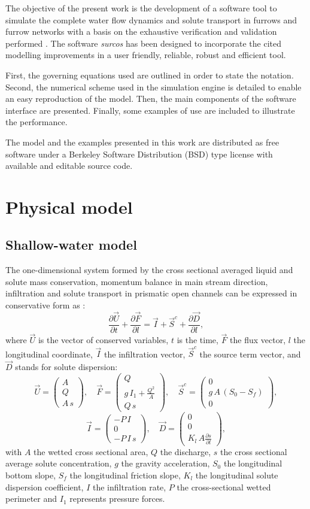 \documentclass[review,authoryear]{elsarticle}
\newcommand{\eq}[2]{\begin{equation}\label{#2}#1\end{equation}}
\newcommand{\PARTIAL}[2] {\frac{\partial#1}{\partial#2}}
\newcommand{\PA}[1] {\left(#1\right)}
\newcommand{\MATRIX}[2] {\PA{\begin{array}{#1}#2\end{array}}}
\begin{document}
The objective of the present work is the development of a software tool to
simulate the complete water flow dynamics and solute transport in furrows and
furrow networks with a basis on the exhaustive verification and validation
performed \citep{JaviSurcos1,JaviSurcos2}. The software \emph{surcos} has been
designed to incorporate the cited modelling improvements in a user friendly,
reliable, robust and efficient tool.

First, the governing equations used are outlined in order to state the notation.
Second, the numerical scheme used in the simulation engine is detailed to enable
an easy reproduction of the model. Then, the main components of the software
interface are presented. Finally, some examples of use are included to
illustrate the performance.

The model and the examples presented in this work are distributed
\citep{Surcos,SurcosGit} as free software under a Berkeley Software Distribution
(BSD) type license with available and editable source code.

\section{Physical model}

\subsection{Shallow-water model}

The one-dimensional system formed by the cross sectional averaged liquid and
solute mass conservation, momentum balance in main stream direction,
infiltration and solute transport in prismatic open channels can be expressed in
conservative form as \citep{JaviSurcos1}:
\eq
{
	\PARTIAL{\vec{U}}{t}+\PARTIAL{\vec{F}}{l}=
	\vec{I}+\vec{S}^c+\PARTIAL{\vec{D}}{l},
}{EqCons}
where $\vec{U}$ is the vector of conserved variables, $t$ is the time, $\vec{F}$
the flux vector,  $l$ the longitudinal coordinate, $\vec{I}$ the infiltration
vector, $\vec{S}^c$ the source term vector, and $\vec{D}$ stands for solute
dispersion:
\[
	\vec{U}=\MATRIX{c}{A\\Q\\A\,s},\quad
	\vec{F}=\MATRIX{c}{Q\\g\,I_1+\frac{Q^2}{A}\\Q\,s},\quad
	\vec{S}^c=\MATRIX{c}{0\\g\,A\,\PA{S_0-S_f}\\0},
\]
\eq
{
	\vec{I}=\MATRIX{c}{-P\,I\\0\\-P\,I\,s},\quad
	\vec{D}=\MATRIX{c}{0\\0\\K_l\,A\PARTIAL{s}{l}},
}{EqVar}
with $A$ the wetted cross sectional area, $Q$ the discharge, $s$ the cross
sectional average solute concentration, $g$ the gravity acceleration, $S_0$ the
longitudinal bottom slope, $S_f$ the longitudinal friction slope, $K_l$ the
longitudinal solute dispersion coefficient, $I$ the infiltration rate, $P$ the
cross-sectional wetted perimeter and $I_1$ represents pressure forces.
\end{document}
